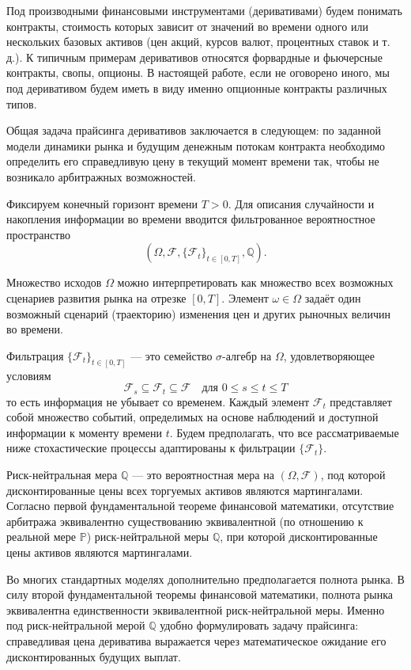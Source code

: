 
Под производными финансовыми инструментами (деривативами) будем понимать
контракты, стоимость которых зависит от значений во времени
одного или нескольких базовых активов (цен акций, курсов валют,
процентных ставок и т.\,д.). К типичным примерам деривативов относятся
форвардные и фьючерсные контракты, свопы, опционы. В настоящей работе, если не оговорено иного, мы под
деривативом будем иметь в виду именно опционные контракты различных типов.

Общая задача прайсинга деривативов заключается в следующем: по заданной модели динамики
рынка и будущим денежным потокам контракта необходимо определить его
справедливую цену в текущий момент времени так, чтобы не возникало
арбитражных возможностей. 

Фиксируем конечный горизонт времени $T>0$. Для описания случайности и накопления информации во времени вводится
фильтрованное вероятностное пространство
\[
(\Omega, \mathcal F, \{\mathcal F_t\}_{t\in[0,T]}, \mathbb Q).
\]

Множество исходов $\Omega$ можно интерпретировать как множество всех
возможных сценариев развития рынка на отрезке $[0,T]$. Элемент
$\omega\in\Omega$ задаёт один возможный сценарий (траекторию) изменения
цен и других рыночных величин во времени.

Фильтрация $\{\mathcal F_t\}_{t\in[0,T]}$ --- это семейство
$\sigma$-алгебр на $\Omega$, удовлетворяющее условиям
\[
\mathcal F_s \subseteq \mathcal F_t \subseteq \mathcal F
\quad\text{для } 0 \le s \le t \le T
\]
то есть информация не убывает со временем. Каждый элемент
$\mathcal F_t$ представляет собой множество событий, определимых на
основе наблюдений и доступной информации к моменту времени $t$.
Будем предполагать, что все рассматриваемые ниже стохастические
процессы адаптированы к фильтрации $\{\mathcal F_t\}$.

Риск-нейтральная мера $\mathbb Q$ --- это вероятностная мера на
$(\Omega,\mathcal F)$, под которой дисконтированные цены всех
торгуемых активов являются мартингалами. Согласно первой фундаментальной
теореме финансовой математики, отсутствие арбитража эквивалентно
существованию эквивалентной (по отношению к реальной мере $\mathbb P$)
риск-нейтральной меры $\mathbb Q$, при которой дисконтированные цены
активов являются мартингалами.

Во многих стандартных моделях дополнительно предполагается полнота
рынка. В силу второй фундаментальной теоремы финансовой математики,
полнота рынка эквивалентна единственности эквивалентной
риск-нейтральной меры. Именно под риск-нейтральной мерой $\mathbb Q$
удобно формулировать задачу прайсинга: справедливая цена дериватива
выражается через математическое ожидание его дисконтированных будущих
выплат.

